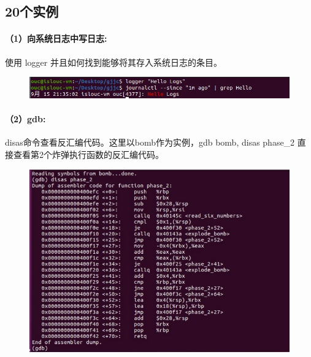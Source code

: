 \documentclass[a4paper, 12pt]{article}
\begin{document}
	\subsection{20个实例}
	
	\paragraph{（1）向系统日志中写日志:}
	使用 logger 并且如何找到能够将其存入系统日志的条目。
	
	
	\begin{figure}[H]
		\centering
		\includegraphics[width=1\textwidth]{015.jpg}
	\end{figure}
	
	\paragraph{（2）gdb:}
	disas命令查看反汇编代码。这里以bomb作为实例，gdb bomb, disas phase\_2 直接查看第2个炸弹执行函数的反汇编代码。
	
	\begin{figure}[H]
		\centering
		\includegraphics[width=1\textwidth]{016.jpg}
	\end{figure}
	
\end{document}
